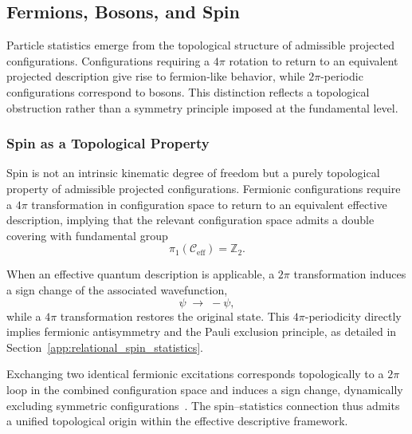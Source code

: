 \subsection{Fermions, Bosons, and Spin}
\label{subsec:fermions-and-bosons}

Particle statistics emerge from the topological structure of admissible
projected configurations.
Configurations requiring a $4\pi$ rotation to return to an equivalent
projected description give rise to fermion-like behavior, while
$2\pi$-periodic configurations correspond to bosons.
This distinction reflects a topological obstruction rather than a symmetry
principle imposed at the fundamental level.

\subsubsection*{Spin as a Topological Property}
\label{subsec:spin_topology}

Spin is not an intrinsic kinematic degree of freedom but a purely
topological property of admissible projected configurations.
Fermionic configurations require a $4\pi$ transformation in configuration
space to return to an equivalent effective description, implying that the
relevant configuration space admits a double covering with fundamental
group
\begin{equation}
  \pi_1(\mathcal{C}_{\mathrm{eff}}) = \mathbb{Z}_2 .
\end{equation}

When an effective quantum description is applicable, a $2\pi$
transformation induces a sign change of the associated wavefunction,
\begin{equation}
  \psi \;\longrightarrow\; -\psi ,
\end{equation}
while a $4\pi$ transformation restores the original state.
This $4\pi$-periodicity directly implies fermionic antisymmetry and the
Pauli exclusion principle, as detailed in
Section~\ref{app:relational_spin_statistics}.

Exchanging two identical fermionic excitations corresponds topologically
to a $2\pi$ loop in the combined configuration space and induces a sign
change, dynamically excluding symmetric
configurations~\cite{Pauli1925}.
The spin--statistics connection thus admits a unified topological origin
within the effective descriptive framework.
